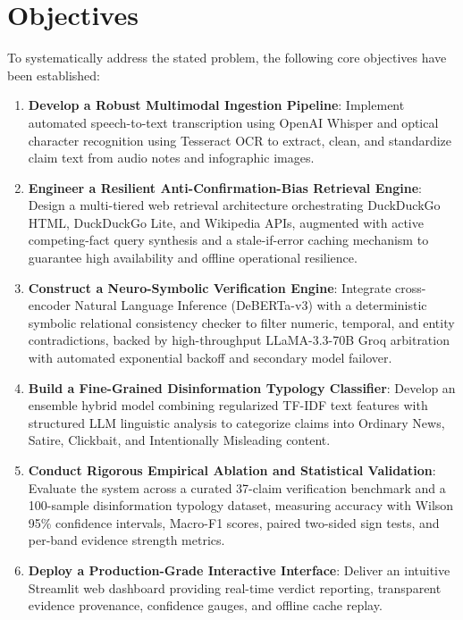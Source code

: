 \documentclass[12pt,a4paper]{report}
\begin{document}
\section{Objectives}
To systematically address the stated problem, the following core objectives have been established:
\begin{enumerate}
    \item \textbf{Develop a Robust Multimodal Ingestion Pipeline}: Implement automated speech-to-text transcription using OpenAI Whisper and optical character recognition using Tesseract OCR to extract, clean, and standardize claim text from audio notes and infographic images.
    \item \textbf{Engineer a Resilient Anti-Confirmation-Bias Retrieval Engine}: Design a multi-tiered web retrieval architecture orchestrating DuckDuckGo HTML, DuckDuckGo Lite, and Wikipedia APIs, augmented with active competing-fact query synthesis and a stale-if-error caching mechanism to guarantee high availability and offline operational resilience.
    \item \textbf{Construct a Neuro-Symbolic Verification Engine}: Integrate cross-encoder Natural Language Inference (DeBERTa-v3) with a deterministic symbolic relational consistency checker to filter numeric, temporal, and entity contradictions, backed by high-throughput LLaMA-3.3-70B Groq arbitration with automated exponential backoff and secondary model failover.
    \item \textbf{Build a Fine-Grained Disinformation Typology Classifier}: Develop an ensemble hybrid model combining regularized TF-IDF text features with structured LLM linguistic analysis to categorize claims into Ordinary News, Satire, Clickbait, and Intentionally Misleading content.
    \item \textbf{Conduct Rigorous Empirical Ablation and Statistical Validation}: Evaluate the system across a curated 37-claim verification benchmark and a 100-sample disinformation typology dataset, measuring accuracy with Wilson 95\% confidence intervals, Macro-F1 scores, paired two-sided sign tests, and per-band evidence strength metrics.
    \item \textbf{Deploy a Production-Grade Interactive Interface}: Deliver an intuitive Streamlit web dashboard providing real-time verdict reporting, transparent evidence provenance, confidence gauges, and offline cache replay.
\end{enumerate}

\end{document}
